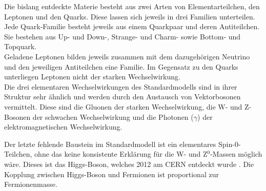 
Die bislang entdeckte Materie besteht aus zwei Arten von Elementarteilchen, den Leptonen und den Quarks. Diese lassen sich jeweils in drei Familien unterteilen. Jede Quark-Familie besteht jeweils aus einem Quarkpaar und deren Antiteilchen. Sie bestehen aus Up- und Down-, Strange- und Charm- sowie Bottom- und Topquark.\\
Geladene Leptonen bilden jeweils zusammen mit dem dazugeh\"origen Neutrino und den jeweiligen Antiteilchen eine Familie. Im Gegensatz zu den Quarks unterliegen Leptonen nicht der starken Wechselwirkung.\\
Die drei elementaren Wechselwirkungen des Standardmodells sind in ihrer Struktur sehr \"ahnlich und werden durch den Austausch von Vektorbosonen vermittelt. Diese sind die Gluonen der starken Wechselwirkung, die W- und Z-Bosonen der schwachen Wechselwirkung und die Photonen ($\gamma$) der elektromagnetischen Wechselwirkung.%

Der letzte fehlende Baustein im Standardmodell ist ein elementares Spin-0-Teilchen, ohne das keine konsistente Erkl\"arung f\"ur die W- und Z$^0$-Massen m\"oglich w\"are. Dieses ist das Higgs-Boson, welches 2012 am CERN entdeckt wurde \cite{Chatrchyan201230}\cite{Aad20121}. Die Kopplung zwischen Higgs-Boson und Fermionen ist proportional zur Fermionenmasse.


